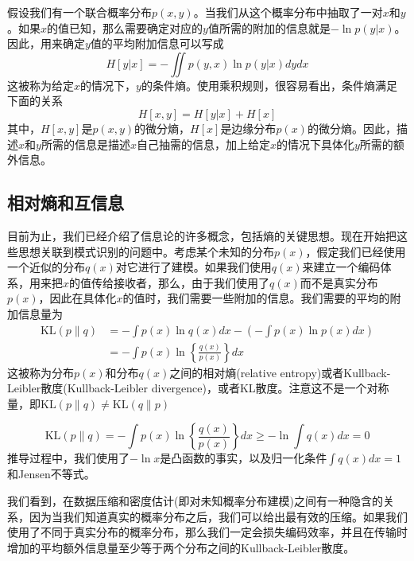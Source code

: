 假设我们有一个联合概率分布$p(x,y)$。当我们从这个概率分布中抽取了一对$x$和$y$。如果$x$的值已知，那么需要确定对应的$y$值所需的附加的信息就是$-\ln p(y|x)$。因此，用来确定$y$值的平均附加信息可以写成
\begin{equation}
	H[y|x]=-\iint p(y,x)\ln p(y|x)dydx
\end{equation}
这被称为给定$x$的情况下，$y$的条件熵。使用乘积规则，很容易看出，条件熵满足下面的关系 
\begin{equation}
	H[x,y]=H[y|x]+H[x]
\end{equation}
其中，$H[x,y]$是$p(x,y)$的微分熵，$H[x]$是边缘分布$p(x)$的微分熵。因此，描述$x$和$y$所需的信息是描述$x$自己抽需的信息，加上给定$x$的情况下具体化$y$所需的额外信息。

\subsection*{相对熵和互信息}
目前为止，我们已经介绍了信息论的许多概念，包括熵的关键思想。现在开始把这些思想关联到模式识别的问题中。考虑某个未知的分布$p(x)$，假定我们已经使用一个近似的分布$q(x)$对它进行了建模。如果我们使用$q(x)$来建立一个编码体系，用来把$x$的值传给接收者，那么，由于我们使用了$q(x)$而不是真实分布$p(x)$，因此在具体化$x$的值时，我们需要一些附加的信息。我们需要的平均的附加信息量为
\begin{equation}
	\begin{aligned}
		\mathrm{KL}(p\| q)&=-\int p(x)\ln q(x)dx-\left(-\int p(x)\ln p(x)dx\right)\\
		&=-\int p(x)\ln \left\{\frac{q(x)}{p(x)} \right\}dx
	\end{aligned}
\end{equation}
这被称为分布$p(x)$和分布$q(x)$之间的相对熵(relative entropy)或者Kullback-Leibler散度(Kullback-Leibler divergence)，或者KL散度。注意这不是一个对称量，即$\mathrm{KL}(p\| q)\neq  \mathrm{KL}(q\| p)$

\begin{equation}
	\mathrm{KL}(p\| q)=-\int p(x)\ln \left\{\frac{q(x)}{p(x)} \right\}dx \geqslant -\ln \int q(x)dx=0
\end{equation}
推导过程中，我们使用了$-\ln x$是凸函数的事实，以及归一化条件$\int q(x)dx=1$和Jensen不等式。

我们看到，在数据压缩和密度估计(即对未知概率分布建模)之间有一种隐含的关系，因为当我们知道真实的概率分布之后，我们可以给出最有效的压缩。如果我们使用了不同于真实分布的概率分布，那么我们一定会损失编码效率，并且在传输时增加的平均额外信息量至少等于两个分布之间的Kullback-Leibler散度。

